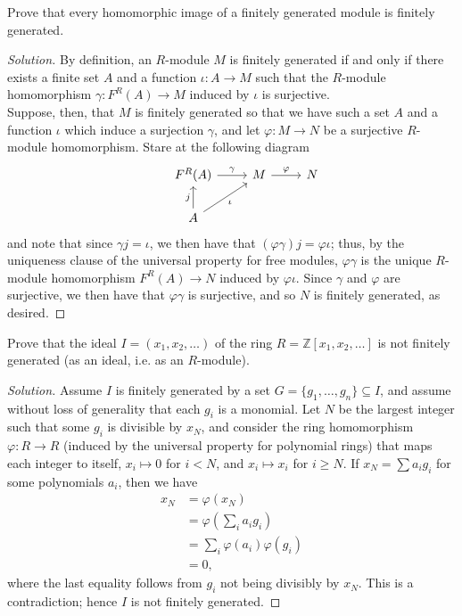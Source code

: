 \documentclass[12pt]{article}
\newenvironment{problem}[2][Problem]{\begin{trivlist}
\item[\hskip \labelsep {\bfseries #1}\hskip \labelsep {\bfseries #2.}]}{\end{trivlist}}
\newcommand{\Z}{\mathbb{Z}}
\newenvironment{solution}
  {\renewcommand\qedsymbol{$\blacksquare$}\begin{proof}[Solution]}
{\end{proof}}
\theoremstyle{remark}
\begin{document}
\newpage

\begin{problem}{6.13}
  Prove that every homomorphic image of a finitely generated module is
  finitely generated.
\end{problem}
\begin{solution}
  By definition, an $R$-module $M$ is finitely generated if and only if
  there exists a finite set $A$ and a function $\iota:A\to M$
  such that the $R$-module homomorphism $\gamma:F^R(A)\to M$
  induced by $\iota$ is surjective. \\
  \indent Suppose, then, that $M$ is finitely generated so that we have such 
  a set $A$ and a function $\iota$ which induce a surjection $\gamma$, and 
  let $\varphi:M\to N$ be a surjective $R$-module homomorphism.
  Stare at the following diagram
  \[
    \begin{tikzcd}
      & F^R(A) \ar{r}{\gamma} & M \ar{r}{\varphi} & N \\
      & A \ar{u}{j} \ar{ur}[swap]{\iota}
    \end{tikzcd}
  \]
  and note that since $\gamma j=\iota$, we then have that 
  $(\varphi\gamma)j=\varphi\iota$; thus, by the uniqueness clause of the
  universal property for free modules, $\varphi\gamma$ is the unique
  $R$-module homomorphism $F^R(A)\to N$ induced by $\varphi\iota$.
  Since $\gamma$ and $\varphi$ are surjective, we then have that
  $\varphi\gamma$ is surjective, and so $N$ is finitely generated, as desired.
\end{solution}

\begin{problem}{6.14}
  Prove that the ideal $I=(x_1,x_2,\dots)$ of the ring $R=\Z[x_1,x_2,\dots]$
  is not finitely generated (as an ideal, i.e. as an $R$-module).
\end{problem}
\begin{solution}
  Assume $I$ is finitely generated by a set $G=\{g_1,\dots,g_n\}\subseteq I$,
  and assume without loss of generality that each $g_i$ is a monomial.
  Let $N$ be the largest integer such that some $g_i$ is divisible by $x_N$,
  and consider the ring homomorphism $\varphi:R\to R$ (induced by the universal
  property for polynomial rings) that maps each integer to itself, 
  $x_i\mapsto0$ for $i<N$, and $x_i\mapsto x_i$ for $i\geq N$.
  If $x_N=\sum a_ig_i$ for some polynomials $a_i$, then we have
  \begin{align*}
    x_N &= \varphi(x_N) \\
    &= \varphi\left(\sum_ia_ig_i\right) \\
    &= \sum_i \varphi(a_i)\varphi(g_i) \\
    &= 0,
  \end{align*}
  where the last equality follows from $g_i$ not being divisibly by $x_N$.
  This is a contradiction; hence $I$ is not finitely generated.
\end{solution}
\end{document}
